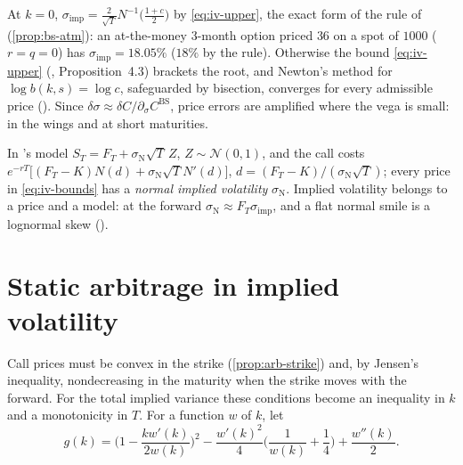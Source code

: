 \begin{remark}\label{rem:iv-solver}
At $k=0$, $\sigma_{\mathrm{imp}}=\frac2{\sqrt T}N^{-1}\big(\frac{1+c}2\big)$ by \eqref{eq:iv-upper}, the exact
form of the rule of \textcite{brenner-subrahmanyam} (\cref{prop:bs-atm}): an at-the-money 3-month option
priced $36$ on a spot of $1000$ ($r=q=0$) has $\sigma_{\mathrm{imp}}=18.05\%$ ($18\%$ by the rule). Otherwise the bound \eqref{eq:iv-upper} (\textcite{tehranchi-bounds}, Proposition~4.3) brackets the root,
and Newton's method for $\log b(k,s)=\log c$, safeguarded by bisection, converges for every admissible
price (). Since $\delta\sigma\approx\delta C/\partial_\sigma C^{\mathrm{BS}}$,
price errors are amplified where the vega is small: in the wings and at short maturities.
\end{remark}

\begin{remark}\label{rem:iv-bachelier}
In \textcite{bachelier-speculation}'s model $S_T=F_T+\sigma_{\mathrm N}\sqrt T\,Z$, $Z\sim\mathcal N(0,1)$,
and the call costs $e^{-rT}\big[(F_T-K)N(d)+\sigma_{\mathrm N}\sqrt TN'(d)\big]$, $d=(F_T-K)/(\sigma_{\mathrm N}\sqrt T)$;
every price in \eqref{eq:iv-bounds} has a \emph{normal implied volatility} $\sigma_{\mathrm N}$. Implied
volatility belongs to a price and a model: at the forward $\sigma_{\mathrm N}\approx F_T\sigma_{\mathrm{imp}}$,
and a flat normal smile is a lognormal skew ().
\end{remark}

\section{Static arbitrage in implied volatility}\label{sec:iv-static}

Call prices must be convex in the strike (\cref{prop:arb-strike}) and, by Jensen's inequality,
nondecreasing in the maturity when the strike moves with the forward. For the total implied variance
these conditions become an inequality in $k$ and a monotonicity in $T$. For a function $w$ of $k$, let
\begin{equation}\label{eq:iv-g}
  g(k)=\Big(1-\frac{kw'(k)}{2w(k)}\Big)^2-\frac{w'(k)^2}4\Big(\frac1{w(k)}+\frac14\Big)+\frac{w''(k)}2 .
\end{equation}

